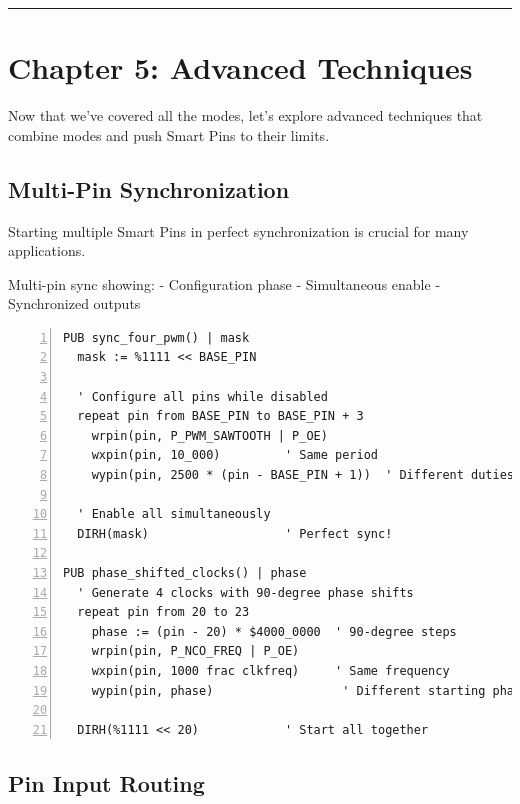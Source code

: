 \documentclass[11pt,a4paper,oneside,english]{book}
\begin{document}
\begin{center}\rule{0.5\linewidth}{0.5pt}\end{center}

\clearpage

\clearpage

\hypertarget{chapter-5-advanced-techniques}{%
\chapter{Chapter 5: Advanced
Techniques}\label{chapter-5-advanced-techniques}}

Now that we've covered all the modes, let's explore advanced techniques
that combine modes and push Smart Pins to their limits.

\hypertarget{multi-pin-synchronization}{%
\section{Multi-Pin Synchronization}\label{multi-pin-synchronization}}

Starting multiple Smart Pins in perfect synchronization is crucial for
many applications.

Multi-pin sync showing: - Configuration phase - Simultaneous enable -
Synchronized outputs

\begin{Spin2Block}
\begin{Verbatim}[numbers=left,numbersep=5pt,xleftmargin=15pt]
PUB sync_four_pwm() | mask
  mask := %1111 << BASE_PIN
  
  ' Configure all pins while disabled
  repeat pin from BASE_PIN to BASE_PIN + 3
    wrpin(pin, P_PWM_SAWTOOTH | P_OE)
    wxpin(pin, 10_000)         ' Same period
    wypin(pin, 2500 * (pin - BASE_PIN + 1))  ' Different duties
  
  ' Enable all simultaneously
  DIRH(mask)                   ' Perfect sync!
  
PUB phase_shifted_clocks() | phase
  ' Generate 4 clocks with 90-degree phase shifts
  repeat pin from 20 to 23
    phase := (pin - 20) * $4000_0000  ' 90-degree steps
    wrpin(pin, P_NCO_FREQ | P_OE)
    wxpin(pin, 1000 frac clkfreq)     ' Same frequency
    wypin(pin, phase)                  ' Different starting phase
  
  DIRH(%1111 << 20)            ' Start all together
\end{Verbatim}
\end{Spin2Block}

\hypertarget{pin-input-routing}{%
\section{Pin Input Routing}\label{pin-input-routing}}
\end{document}
